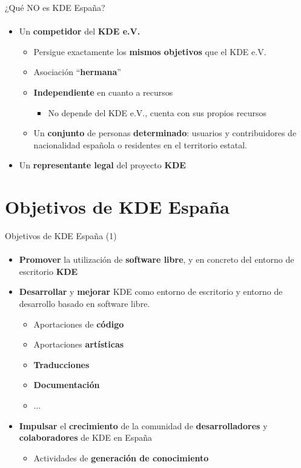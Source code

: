 \documentclass[12pt]{beamer}
\begin{document}
\begin{frame}{¿Qué NO es KDE España?}
  \framesubtitle{}
  \begin{itemize}
    \item Un \textbf{competidor} del \textbf{KDE e.V.}
    \begin{itemize}
      \item Persigue exactamente los \textbf{mismos objetivos} que el KDE e.V.
      \item Asociación ``\textbf{hermana}''
      \item \textbf{Independiente} en cuanto a recursos
      \begin{itemize}
        \item No depende del KDE e.V., cuenta con sus propios recursos
      \end{itemize}
      \item Un \textbf{conjunto} de personas \textbf{determinado}: usuarios y
            contribuidores de nacionalidad española o residentes en el territorio estatal.
    \end{itemize}
    \item Un \textbf{representante legal} del proyecto \textbf{KDE}
  \end{itemize}
\end{frame}


\section{Objetivos de KDE España}

\begin{frame}{Objetivos de KDE España (1)}
  \framesubtitle{}
  \begin{itemize}
    \item \textbf{Promover} la utilización de \textbf{software libre}, y en concreto del entorno de escritorio \textbf{KDE}
    \item \textbf{Desarrollar} y \textbf{mejorar} KDE como entorno de escritorio y entorno de desarrollo basado en software libre.
    \begin{itemize}
      \item Aportaciones de \textbf{código}
      \item Aportaciones \textbf{artísticas}
      \item \textbf{Traducciones}
      \item \textbf{Documentación}
      \item ...
    \end{itemize}
    \item \textbf{Impulsar} el \textbf{crecimiento} de la comunidad de \textbf{desarrolladores} y \textbf{colaboradores} de KDE en España
    \begin{itemize}
      \item Actividades de \textbf{generación de conocimiento}
    \end{itemize}
  \end{itemize}
\end{frame}
\end{document}
